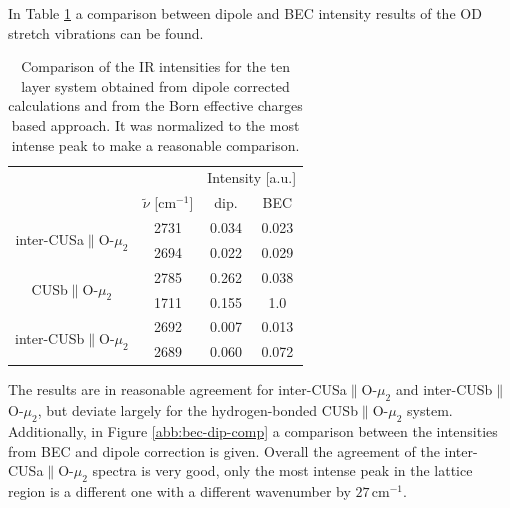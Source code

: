 \documentclass[11pt,DIV=13,BCOR=5mm,a4paper,headinclude]{scrbook}
\begin{document}
In Table \ref{tab:freq_lowcov_comp} a comparison between dipole and BEC intensity results of the OD stretch vibrations can be found.
\begin{table}[!h]
\centering
\caption{Comparison of the IR intensities for the ten layer system obtained from dipole corrected calculations and from the Born effective charges based approach.
It was normalized to the most intense peak to make a reasonable comparison.}
\begin{tabular}{cc|cc}
\toprule
&&\multicolumn{2}{c}{Intensity [a.u.]}\\
&$\tilde{\nu}$ [cm$^{-1}$]& dip. & BEC \\\midrule
\multirow{2}{3cm}{inter-CUSa$\parallel$O-$ \mu_2$}&2731 &0.034 &0.023 \\
 &2694&0.022 &0.029 \\\hline
\multirow{2}{3cm}{CUSb$\parallel$O-$ \mu_2$} & 2785&0.262 &0.038 \\
 & 1711& 0.155&1.0 \\\hline
\multirow{2}{3cm}{inter-CUSb$\parallel$O-$ \mu_2$}& 2692& 0.007&0.013 \\
 & 2689& 0.060& 0.072\\\bottomrule
\end{tabular}
\label{tab:freq_lowcov_comp}
\end{table}
The results are in reasonable agreement for inter-CUSa$\parallel$O-$ \mu_2$ and inter-CUSb$\parallel$O-$ \mu_2$, but deviate largely for the hydrogen-bonded CUSb$\parallel$O-$ \mu_2$ system.
Additionally, in Figure \ref{abb:bec-dip-comp} a comparison between the intensities from BEC and dipole correction is given.
Overall the agreement of the inter-CUSa$\parallel$O-$\mu_2$ spectra is very good, only the most intense peak in the lattice region is a different one with a different wavenumber by $27\,$cm$^{-1}$.
\end{document}
